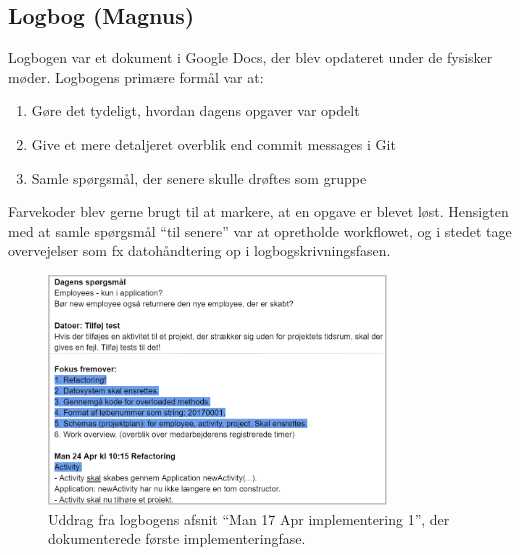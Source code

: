 \subsection{Logbog (Magnus)}
Logbogen var et dokument i Google Docs, der blev opdateret under de fysisker møder.
Logbogens primære formål var at:

\begin{enumerate}
\item Gøre det tydeligt, hvordan dagens opgaver var opdelt
\item Give et mere detaljeret overblik end commit messages i Git
\item Samle spørgsmål, der senere skulle drøftes som gruppe
\end{enumerate}

Farvekoder blev gerne brugt til at markere, at en opgave er blevet løst. Hensigten med at samle spørgsmål “til senere” var at opretholde workflowet, og i stedet tage overvejelser som fx datohåndtering op i logbogskrivningsfasen.

\begin{figure}[H]
    \centering
    \includegraphics[width = 0.8\textwidth]{Figurer/logbog.PNG}
    \caption{Uddrag fra logbogens afsnit “Man 17 Apr implementering 1”, der dokumenterede første implementeringfase.}
\end{figure}

